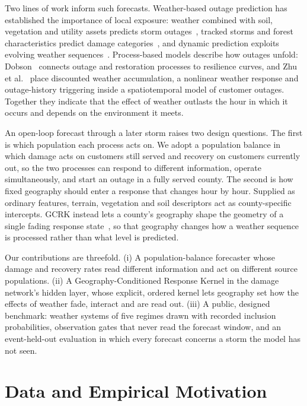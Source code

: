 \documentclass[10pt,twocolumn,letterpaper]{article}
\begin{document}
Two lines of work inform such forecasts. Weather-based outage prediction has established the importance of local
exposure: weather combined with soil, vegetation and utility assets predicts storm outages~\cite{cerrai2019}, tracked
storms and forest characteristics predict damage categories~\cite{tervo2021}, and dynamic prediction exploits evolving
weather sequences~\cite{alpay2020}. Process-based models describe how outages unfold: Dobson~\cite{dobson2023}
connects outage and restoration processes to resilience curves, and Zhu et al.~\cite{zhu2025} place discounted weather
accumulation, a nonlinear weather response and outage-history triggering inside a spatiotemporal model of customer
outages. Together they indicate that the effect of weather outlasts the hour in which it occurs and depends on the
environment it meets.

An open-loop forecast through a later storm raises two design questions. The first is which population each process
acts on. We adopt a population balance in which damage acts on customers still served and recovery on customers
currently out, so the two processes can respond to different information, operate simultaneously, and start an outage
in a fully served county. The second is how fixed geography should enter a response that changes hour by hour.
Supplied as ordinary features, terrain, vegetation and soil descriptors act as county-specific intercepts. GCRK
instead lets a county's geography shape the geometry of a single fading response state~\cite{zhu2021hotspots}, so
that geography changes how a weather sequence is processed rather than what level is predicted.

Our contributions are threefold. (i) A population-balance forecaster whose damage and recovery rates read different
information and act on different source populations. (ii) A Geography-Conditioned Response Kernel in the damage network's hidden
layer, whose explicit, ordered kernel lets geography set how the effects of weather fade, interact and are read out. (iii) A public,
designed benchmark: weather systems of five regimes drawn with recorded inclusion probabilities, observation gates that
never read the forecast window, and an event-held-out evaluation in which every forecast concerns a storm the model
has not seen.

\section{Data and Empirical Motivation}
\end{document}
